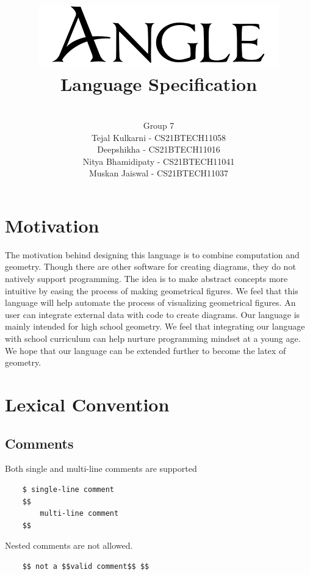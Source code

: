 \documentclass[12pt]{article}
\begin{document}
\date{}{}
\title
{
    \vspace{150pt}
    \includegraphics[scale=0.7]{./images/final_angle.png}
{\LARGE{\\ Language Specification}}
}

\author{
    \vspace{140pt}\\
Group 7                                     \\
Tejal Kulkarni           -  CS21BTECH11058  \\
Deepshikha               -  CS21BTECH11016  \\
Nitya  Bhamidipaty       -  CS21BTECH11041  \\ 
Muskan Jaiswal           -  CS21BTECH11037 
}
\maketitle
\pagebreak
\tableofcontents
\pagebreak
\section{Motivation}
The motivation behind designing this language is to combine computation and geometry.
Though there are other software for creating diagrams, they do not natively support programming.
The idea is to make abstract concepts more intuitive by easing the process of making geometrical figures.
We feel that this language will help automate the process of visualizing geometrical figures.
An user can integrate external data with code to create diagrams.
Our language is mainly intended for high school geometry. 
We feel that integrating our language with school curriculum can help nurture programming mindset at a young age. 
We hope that our language can be extended further to become the latex of geometry.

\section{Lexical Convention}

\subsection{Comments}
Both single and multi-line comments are supported
\begin{verbatim}
    $ single-line comment 
    $$ 
        multi-line comment 
    $$
\end{verbatim}
Nested comments are not allowed.
\begin{verbatim}
    $$ not a $$valid comment$$ $$
\end{verbatim}
\end{document}
